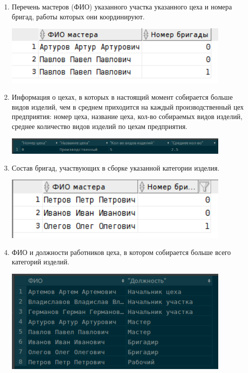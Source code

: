 \begin{enumerate}
    \item Перечень мастеров (ФИО) указанного участка указанного цеха и номера бригад, работы которых они координируют.

    

    \includegraphics[width=11cm]{./screenshots/results/result7.png}

    \item Информация о цехах, в которых в настоящий момент собирается больше видов изделий, чем в среднем приходится на каждый производственный цех предприятия: номер цеха, название цеха, кол-во собираемых видов изделий, среднее количество видов изделий по цехам предприятия.

    

    \includegraphics[width=11cm]{./screenshots/results/result8.png}

    \item Состав бригад, участвующих в сборке указанной категории изделия.

    

    \includegraphics[width=11cm]{./screenshots/results/result9.png}

    \item ФИО и должности работников цеха, в котором собирается больше всего категорий изделий.

    

    \includegraphics[width=11cm]{./screenshots/results/result10.png}

\end{enumerate}


